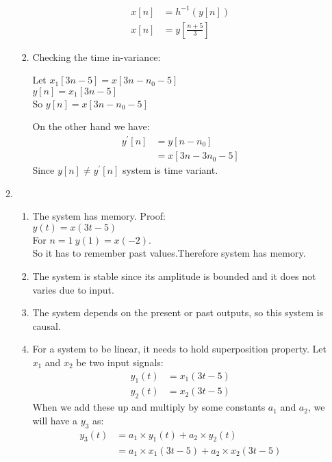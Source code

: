 \documentclass[10pt,a4paper, margin=1in]{article}
\begin{document}
\begin{enumerate}
\begin{enumerate}
\begin{enumerate}
        \begin{align*}
        x[n] &= h^{-1}(y[n]) \\
        x[n] &= y[\frac{n+5}{3}]
        \end{align*}
        \item Checking the time in-variance:
        \begin{center}
        Let $x_1[3n-5] = x[3n-n_0-5]$ \\
         $y[n]= x_1[3n-5]$ \\
        So $y[n] = x[3n - n_0-5]$
        \end{center}
        On the other hand we have:
        \begin{align*}
        y^{'}[n] &= y[n-n_0] \\
        &= x[3n-3n_0-5]
        \end{align*}
        Since $y[n] \neq y^{'}[n]$ system is time variant. \\
        \end{enumerate}
    \item %
    \begin{enumerate}
        \item The system has memory. Proof:\\
        \(y(t)=x(3t-5)\)\\
        For \(n=1\ y(1)=x(-2)\).\\ So it has to remember past values.Therefore system has memory.
        \item The system is stable since its amplitude is bounded and it does not varies due to input.
        \item The system depends on the present or past outputs, so this system is causal.
        \item For a system to be linear, it needs to hold superposition property. Let $x_1$ and $x_2$ be two input signals:
           \begin{align*}
            y_1(t) & = x_1(3t-5) \\
            y_2(t) & = x_2(3t-5)
            \end{align*}
            When we add these up and multiply by some constants $a_1$ and $a_2$, we will have a $y_3$ as:
            \begin{align*}
            y_3(t)&= a_1 \times y_1(t) + a_2 \times y_2(t) \\
                  &= a_1 \times x_1(3t-5)+ a_2 \times x_2(3t-5)
            \end{align*}

\end{enumerate}
\end{enumerate}
\end{enumerate}
\end{document}
